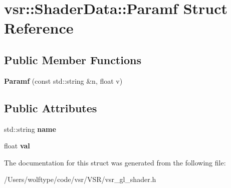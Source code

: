\hypertarget{structvsr_1_1_shader_data_1_1_paramf}{\section{vsr\-:\-:Shader\-Data\-:\-:Paramf Struct Reference}
\label{structvsr_1_1_shader_data_1_1_paramf}
}
\subsection*{Public Member Functions}
\begin{DoxyCompactItemize}
\item 
\hypertarget{structvsr_1_1_shader_data_1_1_paramf_a65033e08faa2c81e9c031b584edfbd1c}{{\bfseries Paramf} (const std\-::string \&n, float v)}\label{structvsr_1_1_shader_data_1_1_paramf_a65033e08faa2c81e9c031b584edfbd1c}

\end{DoxyCompactItemize}
\subsection*{Public Attributes}
\begin{DoxyCompactItemize}
\item 
\hypertarget{structvsr_1_1_shader_data_1_1_paramf_af94aa0dc28800a812deb47b20d8c3e27}{std\-::string {\bfseries name}}\label{structvsr_1_1_shader_data_1_1_paramf_af94aa0dc28800a812deb47b20d8c3e27}

\item 
\hypertarget{structvsr_1_1_shader_data_1_1_paramf_a909d4e2afb5d94b4078221a58a2e7f22}{float {\bfseries val}}\label{structvsr_1_1_shader_data_1_1_paramf_a909d4e2afb5d94b4078221a58a2e7f22}

\end{DoxyCompactItemize}


The documentation for this struct was generated from the following file\-:\begin{DoxyCompactItemize}
\item 
/\-Users/wolftype/code/vsr/\-V\-S\-R/vsr\-\_\-gl\-\_\-shader.\-h\end{DoxyCompactItemize}
